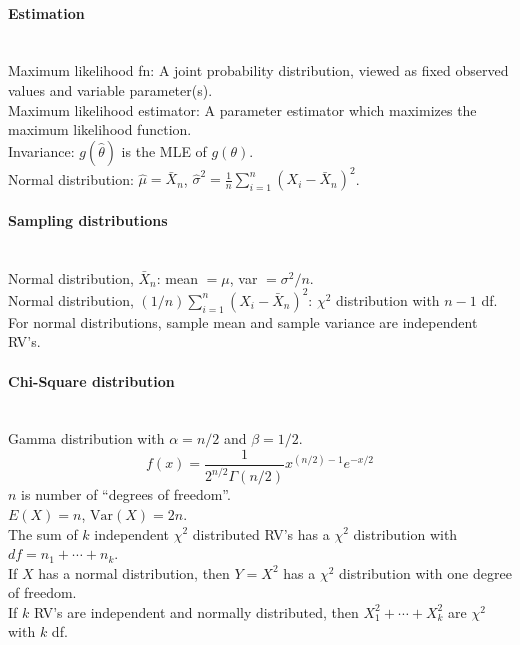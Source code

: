 \documentclass[10pt]{article}
\begin{document}
\paragraph{Estimation}\ \\
Maximum likelihood fn: A joint probability distribution, viewed as fixed observed values and variable parameter(s).\\
Maximum likelihood estimator: A parameter estimator which maximizes the maximum likelihood function.\\
Invariance: $g(\hat{\theta})$ is the MLE of $g(\theta)$.\\
Normal distribution: $\hat{\mu} = \bar{X}_n$, $\hat{\sigma}^2 = \frac{1}{n}\sum_{i=1}^n(X_i-\bar{X}_n)^2$.

\paragraph{Sampling distributions}\ \\
Normal distribution, $\bar{X}_n$: mean $= \mu$, var $= \sigma^2/n$.\\
Normal distribution, $(1/n)\sum_{i=1}^n(X_i-\bar{X}_n)^2$: $\chi^2$ distribution with $n-1$ df.\\
For normal distributions, sample mean and sample variance are independent RV's.

\paragraph{Chi-Square distribution}\ \\
Gamma distribution with $\alpha = n/2$ and $\beta = 1/2$.
\begin{equation*}f(x) = \frac{1}{2^{n/2}\Gamma(n/2)}x^{(n/2)-1}e^{-x/2}\end{equation*}
$n$ is number of ``degrees of freedom''.\\
$E(X) = n$, $\text{Var}(X) = 2n$.\\
The sum of $k$ independent $\chi^2$ distributed RV's has a $\chi^2$ distribution with $df = n_1 + \dotsb + n_k$.\\
If $X$ has a normal distribution, then $Y = X^2$ has a $\chi^2$ distribution with one degree of freedom.\\
If $k$ RV's are independent and normally distributed, then $X_1^2 + \dotsb + X_k^2$ are $\chi^2$ with $k$ df.
\end{document}
